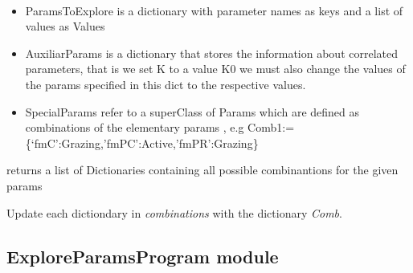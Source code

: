 \documentclass[letterpaper,10pt,english]{sphinxmanual}
\begin{document}

\begin{fulllineitems}
\label{Analisis/ExploreParams:ExploreParams.MakeTotalParamsCombination}~\begin{itemize}
\item {} 
ParamsToExplore is a dictionary with parameter names as keys and a list of values as Values

\item {} 
AuxiliarParams is a dictionary that stores the information about correlated parameters, that is we set K to a value K0 we must also change the values of the params specified in this dict to the respective values.

\item {} 
SpecialParams refer to a superClass of Params which are defined as combinations of the elementary params , e.g Comb1:= \{`fmC':Grazing,'fmPC':Active,'fmPR':Grazing\}

\end{itemize}

returns a list of Dictionaries containing all possible combinantions for the given params

\end{fulllineitems}


\begin{fulllineitems}
\label{Analisis/ExploreParams:ExploreParams.UpdateComb}
Update each dictiondary in \emph{combinations} with the dictionary \emph{Comb}.

\end{fulllineitems}


\begin{fulllineitems}
\label{Analisis/ExploreParams:ExploreParams.setMassTag}
\end{fulllineitems}



\subsection{ExploreParamsProgram module}
\label{Analisis/ExploreParamsProgram:exploreparamsprogram-module}\label{Analisis/ExploreParamsProgram::doc}\label{Analisis/ExploreParamsProgram:module-ExploreParamsProgram}
\end{document}
